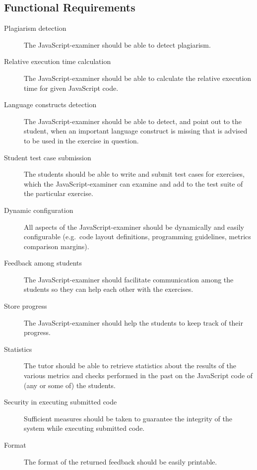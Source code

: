 \subsection{Functional Requirements}
\begin{description}
  \item[Plagiarism detection] The JavaScript-examiner should be able to detect
    plagiarism.
  \item[Relative execution time calculation] The JavaScript-examiner should be 
    able to calculate the relative execution time for given JavaScript code.
  \item[Language constructs detection] The JavaScript-examiner should be able
    to detect, and point out to the student, when an important language
    construct is missing that is advised to be used in the exercise in
    question.
  \item[Student test case submission] The students should be able to write and
    submit test cases for exercises, which the JavaScript-examiner can examine
    and add to the test suite of the particular exercise.
  \item[Dynamic configuration] All aspects of the JavaScript-examiner should be
    dynamically and easily configurable (e.g.\ code layout definitions,
    programming guidelines, metrics comparison margins).
  \item[Feedback among students] The JavaScript-examiner should facilitate 
    communication among the students so they can help each other with the 
    exercises. 
  \item[Store progress] The JavaScript-examiner should help the students to
    keep track of their progress.
  \item[Statistics] The tutor should be able to retrieve statistics about the
    results of the various metrics and \glspl{check} performed in the past on the
    JavaScript code of (any or some of) the students.
  \item[Security in executing submitted code] Sufficient measures should be
    taken to guarantee the integrity of the system while executing submitted
    code.
  \item[Format] The format of the returned feedback should be easily printable.
\end{description}


